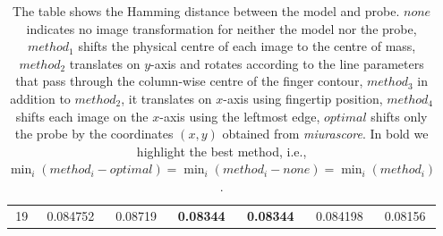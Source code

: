\begin{table}[t]
\begin{tabular}{c|c|c|c|c|c|c}
19  & 0.084752 & 0.08719 & \textbf{0.08344} & \textbf{0.08344} & 0.084198 & 0.08156
    \end{tabular}
    \caption{ The table shows the Hamming distance between the model and probe. $none$ indicates no image transformation for neither the model nor the probe, $method_1$ shifts the physical centre of each image to the centre of mass, $method_2$ translates on $y$-axis and rotates according to the line parameters that pass through the column-wise centre of the finger contour, $method_3$ in addition to $method_2$, it translates on $x$-axis using fingertip position, $method_4$ shifts each image on the $x$-axis using the leftmost edge, $optimal$ shifts only the probe by the coordinates $(x,y)$ obtained from \textit{miurascore}. In bold we highlight the best method, i.e., $\min_i(method_i - optimal) = \min_i(method_i - none) = \min_i(method_i)$.}
    \label{tab:hdms}
\vspace{-3mm}
\end{table}






